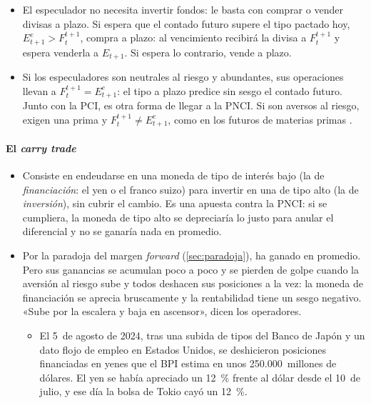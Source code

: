 \documentclass[11pt]{article}
\begin{document}
\begin{itemize}
\item El especulador no necesita invertir fondos: le basta con comprar o vender divisas a plazo. Si espera que el contado futuro supere el tipo pactado hoy, $E^e_{t+1}>F_t^{t+1}$, compra a plazo: al vencimiento recibirá la divisa a $F_t^{t+1}$ y espera venderla a $E_{t+1}$. Si espera lo contrario, vende a plazo.
\item Si los especuladores son neutrales al riesgo y abundantes, sus operaciones llevan a $F_t^{t+1}=E^e_{t+1}$: el tipo a plazo predice sin sesgo el contado futuro. Junto con la PCI, es otra forma de llegar a la PNCI. Si son aversos al riesgo, exigen una prima y $F_t^{t+1}\neq E^e_{t+1}$, como en los futuros de materias primas .
\end{itemize}

\paragraph{El \emph{carry trade}}\label{sec:carry-trade}

\begin{itemize}
\item Consiste en endeudarse en una moneda de tipo de interés bajo (la de \emph{financiación}: el yen o el franco suizo) para invertir en una de tipo alto (la de \emph{inversión}), sin cubrir el cambio. Es una apuesta contra la PNCI: si se cumpliera, la moneda de tipo alto se depreciaría lo justo para anular el diferencial y no se ganaría nada en promedio.
\item Por la paradoja del margen \emph{forward} (\ref{sec:paradoja}), ha ganado en promedio. Pero sus ganancias se acumulan poco a poco y se pierden de golpe cuando la aversión al riesgo sube y todos deshacen sus posiciones a la vez: la moneda de financiación se aprecia bruscamente y la rentabilidad tiene un sesgo negativo\nocite{BrunnermeierNagelPedersen2008Carry}. «Sube por la escalera y baja en ascensor», dicen los operadores.
  \begin{itemize}
  \item El 5~de agosto de 2024, tras una subida de tipos del Banco de Japón y un dato flojo de empleo en Estados Unidos, se deshicieron posiciones financiadas en yenes que el BPI estima en unos 250.000~millones de dólares. El yen se había apreciado un 12~\% frente al dólar desde el 10~de julio, y ese día la bolsa de Tokio cayó un 12~\%\nocite{Aquilina2024Carry,Fed2026H10Yen,FRED2026Nikkei}.
  \end{itemize}
\end{itemize}
\end{document}
